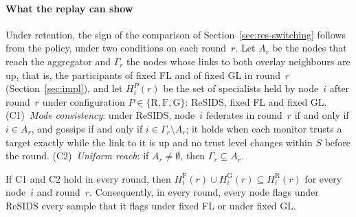 
\paragraph{What the replay can show}
Under retention, the sign of the comparison of Section~\ref{sec:res-switching} follows from the policy,
under two conditions on each round~$r$. Let $A_r$ be the nodes that reach the aggregator and
$\Gamma_r$ the nodes whose links to both overlay neighbours are up, that is, the participants of
fixed FL and of fixed GL in round~$r$ (Section~\ref{sec:impl}), and let $H_i^{P}(r)$ be the set of
specialists held by node~$i$ after round~$r$ under configuration
$P\in\{\mathrm{R},\mathrm{F},\mathrm{G}\}$: ReSIDS, fixed FL and fixed GL.
(C1)~\emph{Mode consistency}: under ReSIDS, node~$i$ federates in round~$r$ if and only if
$i\in A_r$, and gossips if and only if $i\in\Gamma_r\setminus A_r$; it holds when each monitor
trusts a target exactly while the link to it is up and no trust level changes within $S$ before the
round.
(C2)~\emph{Uniform reach}: if $A_r\neq\emptyset$, then $\Gamma_r\subseteq A_r$.

\begin{proposition}\label{prop:dominance}
If C1 and C2 hold in every round, then
$H_i^{\mathrm{F}}(r)\cup H_i^{\mathrm{G}}(r)\subseteq H_i^{\mathrm{R}}(r)$ for every node~$i$ and
round~$r$. Consequently, in every round, every node flags under ReSIDS every sample that it flags
under fixed FL or under fixed GL.
\end{proposition}

